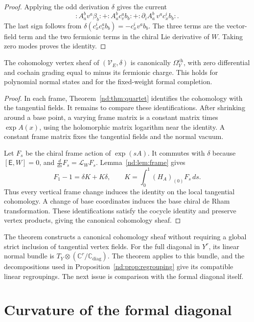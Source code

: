 \begin{proof}
Applying the odd derivation $\delta$ gives the current
\[
 :A^b_av^a\beta_b:
 +:A^b_ac_v^ab_b:
 +:\partial_iA^b_a\,v^ac_x^ib_b:.
\]
The last sign follows from
$\delta(c_x^ic_v^ab_b)=-c_x^iv^ab_b$.
The three terms are the vector-field term and the two fermionic terms
in the chiral Lie derivative of $W$. Taking zero modes proves the
identity.
\end{proof}

\begin{theorem}\label{nd:thm:absolute}
The cohomology vertex sheaf of $(\mathcal V_E,\delta)$ is canonically
$\Omega_Y^{\mathrm{ch}}$, with zero differential and cochain grading
equal to minus its fermionic charge. This holds for polynomial normal
states and for the fixed-weight formal completion.
\end{theorem}

\begin{proof}
In each frame, Theorem~\ref{nd:thm:quartet} identifies the cohomology
with the tangential fields. It remains to compare these identifications.
After shrinking around a base point, a varying frame matrix is a
constant matrix times $\exp A(x)$, using the holomorphic matrix
logarithm near the identity. A constant frame matrix fixes the
tangential fields and the normal vacuum.

Let $F_s$ be the chiral frame action of $\exp(sA)$. It commutes with
$\delta$ because $[\mathsf E,W]=0$, and
$\frac{d}{ds}F_s=\mathcal L_WF_s$.
Lemma~\ref{nd:lem:frame} gives
\[
 F_1-1=\delta K+K\delta,
 \qquad K=\int_0^1(H_A)_{(0)}F_s\,ds.
\]
Thus every vertical frame change induces the identity on the local
tangential cohomology. A change of base coordinates induces the base
chiral de Rham transformation. These identifications satisfy the
cocycle identity and preserve vertex products, giving the canonical
cohomology sheaf.
\end{proof}

The theorem constructs a canonical cohomology sheaf without requiring
a global strict inclusion of tangential vertex fields.
For the full diagonal in $Y^r$, its linear normal bundle is
$T_Y\otimes(\mathbb C^r/\mathbb C_{\mathrm{diag}})$.
The theorem applies to this bundle, and the decompositions used in
Proposition~\ref{nd:prop:regrouping} give its compatible linear
regroupings. The next issue is comparison with the formal diagonal
itself.

\section{Curvature of the formal diagonal}
\label{nd:sec:curvature}

